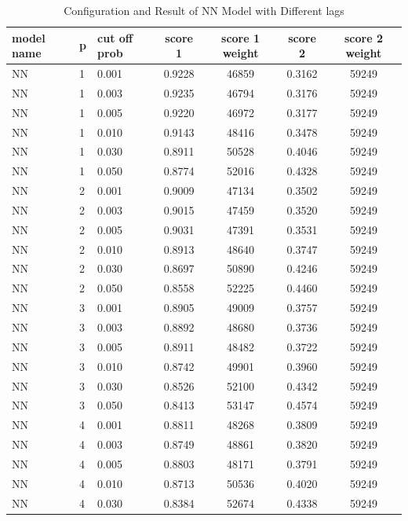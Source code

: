 \documentclass{article}
\begin{document}
\begin{longtable}[htbp]{l|l|l|*{4}{c}}
  \caption{Configuration and Result of NN Model with Different lags}
  \label{tab:tab1.3.7} \\
  \textbf{model name} & \textbf{p} & \textbf{cut off prob} & \textbf{score 1} & \textbf{score 1 weight} & \textbf{score 2} & \textbf{score 2 weight} \\
      \hline
      NN & 1 & 0.001 & 0.9228 & 46859 & 0.3162 & 59249\\
      NN & 1 & 0.003 & 0.9235 & 46794 & 0.3176 & 59249\\
      NN & 1 & 0.005 & 0.9220 & 46972 & 0.3177 & 59249\\
      NN & 1 & 0.010 & 0.9143 & 48416 & 0.3478 & 59249\\
      NN & 1 & 0.030 & 0.8911 & 50528 & 0.4046 & 59249\\
      NN & 1 & 0.050 & 0.8774 & 52016 & 0.4328 & 59249\\
      NN & 2 & 0.001 & 0.9009 & 47134 & 0.3502 & 59249\\
      NN & 2 & 0.003 & 0.9015 & 47459 & 0.3520 & 59249\\
      NN & 2 & 0.005 & 0.9031 & 47391 & 0.3531 & 59249\\
      NN & 2 & 0.010 & 0.8913 & 48640 & 0.3747 & 59249\\
      NN & 2 & 0.030 & 0.8697 & 50890 & 0.4246 & 59249\\
      NN & 2 & 0.050 & 0.8558 & 52225 & 0.4460 & 59249\\
      NN & 3 & 0.001 & 0.8905 & 49009 & 0.3757 & 59249\\
      NN & 3 & 0.003 & 0.8892 & 48680 & 0.3736 & 59249\\
      NN & 3 & 0.005 & 0.8911 & 48482 & 0.3722 & 59249\\
      NN & 3 & 0.010 & 0.8742 & 49901 & 0.3960 & 59249\\
      NN & 3 & 0.030 & 0.8526 & 52100 & 0.4342 & 59249\\
      NN & 3 & 0.050 & 0.8413 & 53147 & 0.4574 & 59249\\
      NN & 4 & 0.001 & 0.8811 & 48268 & 0.3809 & 59249\\
      NN & 4 & 0.003 & 0.8749 & 48861 & 0.3820 & 59249\\
      NN & 4 & 0.005 & 0.8803 & 48171 & 0.3791 & 59249\\
      NN & 4 & 0.010 & 0.8713 & 50536 & 0.4020 & 59249\\
      NN & 4 & 0.030 & 0.8384 & 52674 & 0.4338 & 59249\\

\end{longtable}
\end{document}
